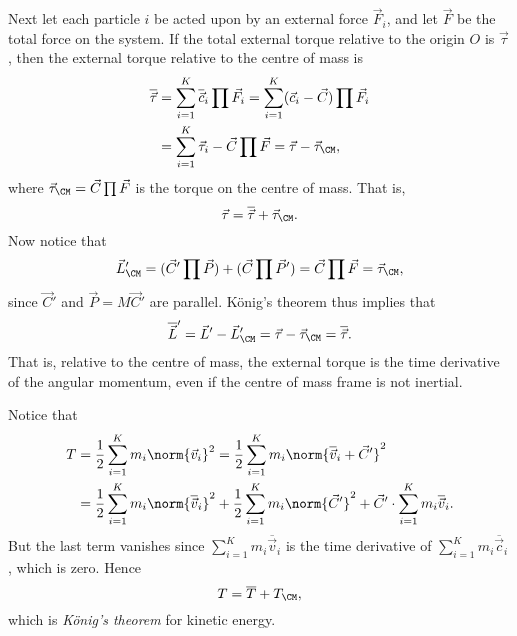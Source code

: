 \documentclass[article, a4paper, 11pt, oneside]{memoir}
\numberwithin{equation}{chapter}
\begin{document}
\begin{remarkbreak}
    Next let each particle $i$ be acted upon by an external force $\vec{F}_i$, and let $\vec{F}$ be the total force on the system. If the total external torque relative to the origin $O$ is $\vec{\tau}$, then the external torque relative to the centre of mass is
    \begin{align*}
        \overline{\vec{\tau}}
            &= \sum_{i=1}^K \overline{\vec{c}}_i \prod \vec{F}_i
             = \sum_{i=1}^K (\vec{c}_i - \vec{C}) \prod \vec{F}_i \\
            &= \sum_{i=1}^K \vec{\tau}_i - \vec{C} \prod \vec{F}
             = \vec{\tau} - \vec{\tau}_\CM,
    \end{align*}
    where $\vec{\tau}_\CM = \vec{C} \prod \vec{F}$ is the torque on the centre of mass. That is,
    \begin{equation*}
        \vec{\tau}
            = \overline{\vec{\tau}} + \vec{\tau}_\CM.
    \end{equation*}
    Now notice that 
    \begin{equation*}
        \vec{L}_\CM'
            = (\vec{C}' \prod \vec{P}) + (\vec{C} \prod \vec{P}')
            = \vec{C} \prod \vec{F}
            = \vec{\tau}_\CM,
    \end{equation*}
    since $\vec{C}'$ and $\vec{P} = M\vec{C}'$ are parallel. König's theorem thus implies that
    \begin{equation*}
        \overline{\vec{L}}'
            = \vec{L}' - \vec{L}_\CM'
            = \vec{\tau} - \vec{\tau}_\CM
            = \overline{\vec{\tau}}.
    \end{equation*}
    That is, relative to the centre of mass, the external torque is the time derivative of the angular momentum, even if the centre of mass frame is not inertial.
\end{remarkbreak}


\begin{remarkbreak}
    Notice that
    \begin{align*}
        T
            &= \frac{1}{2} \sum_{i=1}^K m_i \norm{\vec{v}_i}^2
             = \frac{1}{2} \sum_{i=1}^K m_i \norm{\overline{\vec{v}}_i + \vec{C}'}^2 \\
            &= \frac{1}{2} \sum_{i=1}^K m_i \norm{\overline{\vec{v}}_i}^2
              + \frac{1}{2} \sum_{i=1}^K m_i \norm{\vec{C}'}^2
              + \vec{C}' \cdot \sum_{i=1}^K m_i \overline{\vec{v}}_i.
    \end{align*}
    But the last term vanishes since $\sum_{i=1}^K m_i \overline{\vec{v}}_i$ is the time derivative of $\sum_{i=1}^K m_i \overline{\vec{c}}_i$, which is zero. Hence
    \begin{equation*}
        T
            = \overline{T} + T_\CM,
    \end{equation*}
    which is \emph{König's theorem} for kinetic energy.
\end{remarkbreak}
\end{document}
